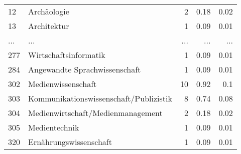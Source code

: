 \begin{longtable}{lXrrr}
        12 & \multicolumn{1}{X}{Archäologie} & %
          \num{2} &
          \num[round-mode=places,round-precision=2]{0,18} &
          \num[round-mode=places,round-precision=2]{0,02} \\
        13 & \multicolumn{1}{X}{Architektur} & %
          \num{1} &
          \num[round-mode=places,round-precision=2]{0,09} &
          \num[round-mode=places,round-precision=2]{0,01} \\
       ... & ... & ... & ... & ... \\
        277 & \multicolumn{1}{X}{Wirtschaftsinformatik} & %
          \num{1} &
          \num[round-mode=places,round-precision=2]{0,09} &
          \num[round-mode=places,round-precision=2]{0,01} \\

        284 & \multicolumn{1}{X}{Angewandte Sprachwissenschaft} & %
          \num{1} &
          \num[round-mode=places,round-precision=2]{0,09} &
          \num[round-mode=places,round-precision=2]{0,01} \\

        302 & \multicolumn{1}{X}{Medienwissenschaft} & %
          \num{10} &
          \num[round-mode=places,round-precision=2]{0,92} &
          \num[round-mode=places,round-precision=2]{0,1} \\

        303 & \multicolumn{1}{X}{Kommunikationswissenschaft/Publizistik} & %
          \num{8} &
          \num[round-mode=places,round-precision=2]{0,74} &
          \num[round-mode=places,round-precision=2]{0,08} \\

        304 & \multicolumn{1}{X}{Medienwirtschaft/Medienmanagement} & %
          \num{2} &
          \num[round-mode=places,round-precision=2]{0,18} &
          \num[round-mode=places,round-precision=2]{0,02} \\

        305 & \multicolumn{1}{X}{Medientechnik} & %
          \num{1} &
          \num[round-mode=places,round-precision=2]{0,09} &
          \num[round-mode=places,round-precision=2]{0,01} \\

        320 & \multicolumn{1}{X}{Ernährungswissenschaft} & %
          \num{1} &
          \num[round-mode=places,round-precision=2]{0,09} &
          \num[round-mode=places,round-precision=2]{0,01} \\


\end{longtable}
